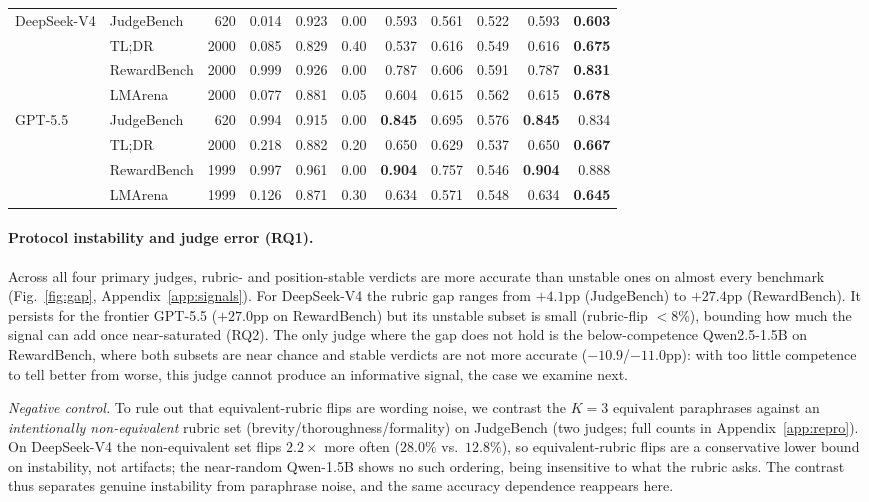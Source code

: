 \begin{table}[t]
\begin{tabular}{ll rrrr r rrrr}
\multirow{4}{*}{DeepSeek-V4} & JudgeBench & 620 & 0.014 & 0.923 & 0.00 & 0.593 & 0.561 & 0.522 & 0.593 & \textbf{0.603} \\
 & TL;DR & 2000 & 0.085 & 0.829 & 0.40 & 0.537 & 0.616 & 0.549 & 0.616 & \textbf{0.675} \\
 & RewardBench & 2000 & 0.999 & 0.926 & 0.00 & 0.787 & 0.606 & 0.591 & 0.787 & \textbf{0.831} \\
 & LMArena & 2000 & 0.077 & 0.881 & 0.05 & 0.604 & 0.615 & 0.562 & 0.615 & \textbf{0.678} \\
\midrule
\multirow{4}{*}{GPT-5.5} & JudgeBench & 620 & 0.994 & 0.915 & 0.00 & \textbf{0.845} & 0.695 & 0.576 & \textbf{0.845} & 0.834 \\
 & TL;DR & 2000 & 0.218 & 0.882 & 0.20 & 0.650 & 0.629 & 0.537 & 0.650 & \textbf{0.667} \\
 & RewardBench & 1999 & 0.997 & 0.961 & 0.00 & \textbf{0.904} & 0.757 & 0.546 & \textbf{0.904} & 0.888 \\
 & LMArena & 1999 & 0.126 & 0.871 & 0.30 & 0.634 & 0.571 & 0.548 & 0.634 & \textbf{0.645} \\
\bottomrule
\end{tabular}
\end{table}

\paragraph{Protocol instability and judge error (RQ1).}
Across all four primary judges, rubric- and position-stable verdicts are more accurate than unstable ones on almost every benchmark (Fig.~\ref{fig:gap}, Appendix~\ref{app:signals}). For DeepSeek-V4 the rubric gap ranges from $+4.1$pp (JudgeBench) to $+27.4$pp (RewardBench). It persists for the frontier GPT-5.5 ($+27.0$pp on RewardBench) but its unstable subset is small (rubric-flip $<$8\%), bounding how much the signal can add once near-saturated (RQ2). The only judge where the gap does not hold is the below-competence Qwen2.5-1.5B on RewardBench, where both subsets are near chance and stable verdicts are not more accurate ($-10.9$/$-11.0$pp): with too little competence to tell better from worse, this judge cannot produce an informative signal, the case we examine next.

\emph{Negative control.} To rule out that equivalent-rubric flips are wording noise, we contrast the $K{=}3$ equivalent paraphrases against an \emph{intentionally non-equivalent} rubric set (brevity/thoroughness/formality) on JudgeBench (two judges; full counts in Appendix~\ref{app:repro}). On DeepSeek-V4 the non-equivalent set flips $2.2\times$ more often ($28.0\%$ vs.\ $12.8\%$), so equivalent-rubric flips are a conservative lower bound on instability, not artifacts; the near-random Qwen-1.5B shows no such ordering, being insensitive to what the rubric asks. The contrast thus separates genuine instability from paraphrase noise, and the same accuracy dependence reappears here.

